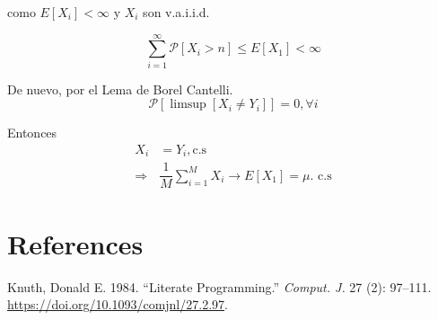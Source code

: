 \documentclass[
  letterpaper,
  DIV=11,
  numbers=noendperiod]{scrreprt}
\newlength{\cslhangindent}
\newlength{\cslentryspacingunit} %
\newenvironment{CSLReferences}[2] %
 {%
  \setlength{\parindent}{0pt}
  \ifodd #1
  \let\oldpar\par
  \def\par{\hangindent=\cslhangindent\oldpar}
  \fi
  \setlength{\parskip}{#2\cslentryspacingunit}
 }%
 {}
\begin{document}
como \(E\left[X_{i}\right]<\infty\) y \(X_{i}\) son v.a.i.i.d.

\[
\sum_{i=1}^{\infty}\mathcal{P}\left[X_{i}>n\right]\leq E\left[X_{1}\right]<\infty
\]

De nuevo, por el Lema de Borel Cantelli. \[
\mathcal{P}\left[\limsup\left[X_{i}\neq Y_{i}\right]\right]=0,\forall i
\]

Entonces \begin{align*}
X_{i} & =Y_{i},\text{c.s}\\
\Rightarrow & \dfrac{1}{M}\sum_{i=1}^{M}X_{i}\to E\left[X_{1}\right]=\mu.\text{ c.s}
\end{align*}


\hypertarget{section}{%
\chapter{}\label{section}}


\hypertarget{references}{%
\chapter*{References}\label{references}}


\hypertarget{refs}{}
\begin{CSLReferences}{1}{0}
\leavevmode{}%
Knuth, Donald E. 1984. {``Literate Programming.''} \emph{Comput. J.} 27
(2): 97--111. \url{https://doi.org/10.1093/comjnl/27.2.97}.

\end{CSLReferences}
\end{document}
